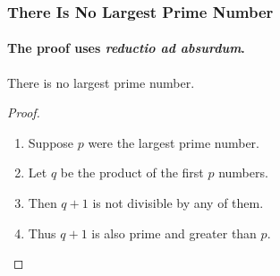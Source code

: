 \begin{frame}
\frametitle{There Is No Largest Prime Number}
\framesubtitle{The proof uses \textit{reductio ad absurdum}.}
\begin{theorem}
There is no largest prime number.
\end{theorem}
\begin{proof}
\begin{enumerate}
\item<1-| alert@1> Suppose $p$ were the largest prime number.
\item<2-> Let $q$ be the product of the first $p$ numbers.
\item<3-> Then $q+1$ is not divisible by any of them.
\item<1-> Thus $q+1$ is also prime and greater than $p$.\qedhere
\end{enumerate}
\end{proof}
\end{frame}
